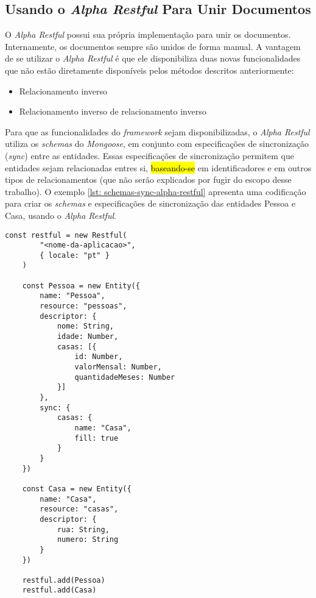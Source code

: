 
\subsection{Usando o \textit{Alpha Restful} Para Unir Documentos}

O \textit{Alpha Restful} possui sua própria implementação para unir os documentos. Internamente, os documentos sempre são unidos de forma manual. A vantagem de se utilizar o \textit{Alpha Restful} é que ele disponibiliza duas novas funcionalidades que não estão diretamente disponíveis pelos métodos descritos anteriormente:

\begin{itemize}
	\item Relacionamento inverso
	\item Relacionamento inverso de relacionamento inverso
\end{itemize}

Para que as funcionalidades do \textit{framework} sejam disponibilizadas, o \textit{Alpha Restful} utiliza os \textit{schemas} do \textit{Mongoose}, em conjunto com especificações de sincronização (\textit{sync}) entre as entidades. Essas especificações de sincronização permitem que entidades sejam relacionadas entres si, \hl{baseando-se} em identificadores e em outros tipos de relacionamentos (que não serão explicados por fugir do escopo desse trabalho). O exemplo \ref{lst: schemas-sync-alpha-restful} apresenta uma codificação para criar os \textit{schemas} e especificações de sincronização das entidades Pessoa e Casa, usando o \textit{Alpha Restful}.


\begin{lstlisting}[style=ES6, caption={Definição de \textit{Schemas} no \textit{Alpha Restful}\label{lst: schemas-sync-alpha-restful}}]
    const restful = new Restful(
        "<nome-da-aplicacao>",
        { locale: "pt" }
    )

    const Pessoa = new Entity({
        name: "Pessoa",
        resource: "pessoas",
        descriptor: {
            nome: String,
            idade: Number,
            casas: [{
                id: Number,
                valorMensal: Number,
                quantidadeMeses: Number
            }]
        },
        sync: {
            casas: {
                name: "Casa",
                fill: true
            }
        }
    })
    
    const Casa = new Entity({
        name: "Casa",
        resource: "casas",
        descriptor: {
            rua: String,
            numero: String
        }
    })
    
    restful.add(Pessoa)
    restful.add(Casa)
\end{lstlisting}

